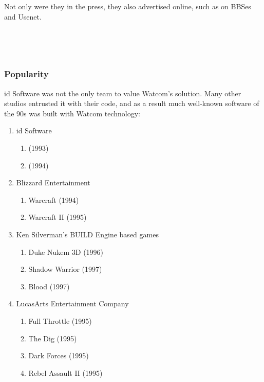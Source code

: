 \vspace{-4mm}
Not only were they in the press, they also advertised online, such as on BBSes and Usenet.\\
\par
{}\\
\par
{}\\


\subsubsection{Popularity}
id Software was not the only team to value Watcom's solution. Many other studios entrusted it with their code, and as a result much well-known software of the 90s was built with Watcom technology:\\
\begin{enumerate}
\item id Software 
       \begin{enumerate}
       \item \doom{} (1993)
       \item \doomii{} (1994)
       \end{enumerate} 
\item Blizzard Entertainment 
       \begin{enumerate}
       \item Warcraft (1994)
       \item Warcraft II (1995)
       \end{enumerate}
\item Ken Silverman's BUILD Engine based games
      \begin{enumerate}
       \item Duke Nukem 3D (1996)
       \item Shadow Warrior (1997)
       \item Blood (1997)
       \end{enumerate}
\item LucasArts Entertainment Company
      \begin{enumerate}
       \item Full Throttle (1995)
       \item The Dig (1995)
       \item Dark Forces  (1995)
       \item Rebel Assault II  (1995)    
      \end{enumerate}
\end{enumerate}
\par


